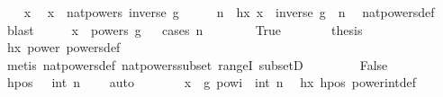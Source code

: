 \begin{isabellebody}
%
\isadelimproof
%
\endisadelimproof
%
\isatagproof
{}\isamarkupfalse%
\isanewline
\ \ \isamarkupfalse%
\ x\ \isamarkupfalse%
\ {\isachardoublequoteopen}x\ {\isasymin}\ nat{\isacharunderscore}{\kern0pt}powers\ {\isacharparenleft}{\kern0pt}inverse\ g{\isacharparenright}{\kern0pt}{\isachardoublequoteclose}\isanewline
\ \ \isamarkupfalse%
\ \isamarkupfalse%
\ n\ \ hx{\isacharcolon}{\kern0pt}\ {\isachardoublequoteopen}x\ {\isacharequal}{\kern0pt}\ {\isacharparenleft}{\kern0pt}inverse\ g{\isacharparenright}{\kern0pt}\ {\isacharcircum}{\kern0pt}\ n{\isachardoublequoteclose}\ \isamarkupfalse%
\ nat{\isacharunderscore}{\kern0pt}powers{\isacharunderscore}{\kern0pt}def\ \isamarkupfalse%
\ blast\isanewline
\ \ \isamarkupfalse%
\ \isamarkupfalse%
\ {\isachardoublequoteopen}x\ {\isasymin}\ powers\ g{\isachardoublequoteclose}\isanewline
\ \ \isamarkupfalse%
{\isacharparenleft}{\kern0pt}cases\ {\isachardoublequoteopen}n\ {\isacharequal}{\kern0pt}\ {}{\isachardoublequoteclose}{\isacharparenright}{\kern0pt}\isanewline
\ \ \ \ \isamarkupfalse%
\ True\isanewline
\ \ \ \ \isamarkupfalse%
\ \isamarkupfalse%
\ {\isacharquery}{\kern0pt}thesis\ \isamarkupfalse%
\ hx\ power{}\ powers{\isacharunderscore}{\kern0pt}def\isanewline
\ \ \ \ \ \ \isamarkupfalse%
\ {\isacharparenleft}{\kern0pt}metis\ nat{\isacharunderscore}{\kern0pt}powers{\isacharunderscore}{\kern0pt}def\ nat{\isacharunderscore}{\kern0pt}powers{\isacharunderscore}{\kern0pt}subset\ rangeI\ subsetD{\isacharparenright}{\kern0pt}\isanewline
\ \ \isamarkupfalse%
\isanewline
\ \ \ \ \isamarkupfalse%
\ False\isanewline
\ \ \ \ \isamarkupfalse%
\ \isamarkupfalse%
\ hpos{\isacharcolon}{\kern0pt}\ {\isachardoublequoteopen}{\isasymnot}\ {\isacharparenleft}{\kern0pt}{\isacharminus}{\kern0pt}\ int\ n{\isacharparenright}{\kern0pt}\ {\isasymge}\ {}{\isachardoublequoteclose}\ \isamarkupfalse%
\ auto\isanewline
\ \ \ \ \isamarkupfalse%
\ \isamarkupfalse%
\ {\isachardoublequoteopen}x\ {\isacharequal}{\kern0pt}\ g\ powi\ {\isacharparenleft}{\kern0pt}{\isacharminus}{\kern0pt}\ int\ n{\isacharparenright}{\kern0pt}{\isachardoublequoteclose}\ \isamarkupfalse%
\ hx\ hpos\ power{\isacharunderscore}{\kern0pt}int{\isacharunderscore}{\kern0pt}def\ \isamarkupfalse%

\end{isabellebody}
